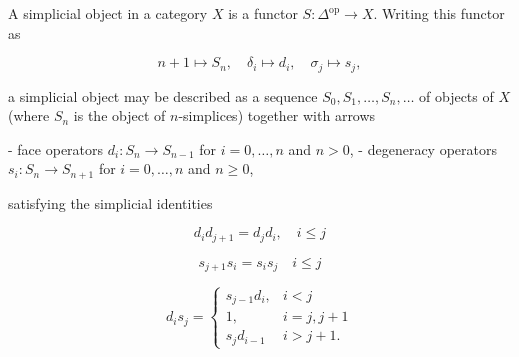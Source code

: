 A simplicial object in a category $X$ is a functor $S : \Delta^{\text{op}} \rightarrow X$. Writing this functor as

$$n + 1 \mapsto S_n, \quad \delta_i \mapsto d_i, \quad \sigma_j \mapsto s_j,$$

a simplicial object may be described as a sequence $S_0, S_1, \ldots, S_n, \ldots$ of objects of $X$ (where $S_n$ is the object of $n$-simplices) together with arrows

- face operators $d_i : S_n \rightarrow S_{n-1}$ for $i = 0, \ldots, n$ and $n > 0$,
- degeneracy operators $s_i : S_n \rightarrow S_{n+1}$ for $i = 0, \ldots, n$ and $n \geq 0$,

satisfying the simplicial identities

$$d_i d_{j+1} = d_j d_i, \quad i \leq j$$

$$s_{j+1} s_i = s_i s_j \quad i \leq j$$

$$d_i s_j = \begin{cases} s_{j-1} d_i, & i < j \\ 1, & i = j, j + 1 \\ s_j d_{i-1} & i > j + 1. \end{cases}$$
